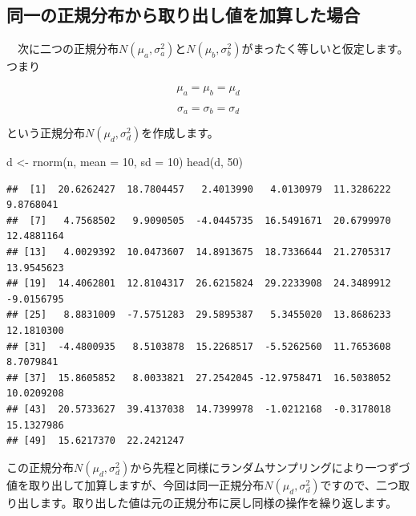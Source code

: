 \documentclass[a4paper]{tufte-handout}
\newenvironment{Shaded}{}{}
\newcommand{\AttributeTok}[1]{\textcolor[rgb]{0.49,0.56,0.16}{#1}}
\newcommand{\DecValTok}[1]{\textcolor[rgb]{0.25,0.63,0.44}{#1}}
\newcommand{\FunctionTok}[1]{\textcolor[rgb]{0.02,0.16,0.49}{#1}}
\newcommand{\NormalTok}[1]{#1}
\newcommand{\OtherTok}[1]{\textcolor[rgb]{0.00,0.44,0.13}{#1}}
\begin{document}
\newpage

\hypertarget{ux540cux4e00ux306eux6b63ux898fux5206ux5e03ux304bux3089ux53d6ux308aux51faux3057ux5024ux3092ux52a0ux7b97ux3057ux305fux5834ux5408}{%
\subsection{\texorpdfstring{\textbf{同一の正規分布から取り出し値を加算した場合}}{同一の正規分布から取り出し値を加算した場合}}\label{ux540cux4e00ux306eux6b63ux898fux5206ux5e03ux304bux3089ux53d6ux308aux51faux3057ux5024ux3092ux52a0ux7b97ux3057ux305fux5834ux5408}}

　次に二つの正規分布\(N(\mu_a, \sigma^2_a)\)と\(N(\mu_b,\sigma^2_b)\)がまったく等しいと仮定します。つまり

\[\mu_a = \mu_b = \mu_d\]

\[\sigma_a = \sigma_b = \sigma_d\]

という正規分布\(N(\mu_d, \sigma^2_d)\)を作成します。

\begin{Shaded}
\begin{Highlighting}[numbers=left,,]
\NormalTok{d }\OtherTok{\textless{}{-}} \FunctionTok{rnorm}\NormalTok{(n, }\AttributeTok{mean =} \DecValTok{10}\NormalTok{, }\AttributeTok{sd =} \DecValTok{10}\NormalTok{)}
\FunctionTok{head}\NormalTok{(d, }\DecValTok{50}\NormalTok{)}
\end{Highlighting}
\end{Shaded}

\begin{verbatim}
##  [1]  20.6262427  18.7804457   2.4013990   4.0130979  11.3286222   9.8768041
##  [7]   4.7568502   9.9090505  -4.0445735  16.5491671  20.6799970  12.4881164
## [13]   4.0029392  10.0473607  14.8913675  18.7336644  21.2705317  13.9545623
## [19]  14.4062801  12.8104317  26.6215824  29.2233908  24.3489912  -9.0156795
## [25]   8.8831009  -7.5751283  29.5895387   5.3455020  13.8686233  12.1810300
## [31]  -4.4800935   8.5103878  15.2268517  -5.5262560  11.7653608   8.7079841
## [37]  15.8605852   8.0033821  27.2542045 -12.9758471  16.5038052  10.0209208
## [43]  20.5733627  39.4137038  14.7399978  -1.0212168  -0.3178018  15.1327986
## [49]  15.6217370  22.2421247
\end{verbatim}

この正規分布\(N(\mu_d, \sigma^2_d)\)から先程と同様にランダムサンプリングにより一つずづ値を取り出して加算しますが、今回は同一正規分布\(N(\mu_d, \sigma^2_d)\)ですので、二つ取り出します。取り出した値は元の正規分布に戻し同様の操作を繰り返します。
\end{document}

